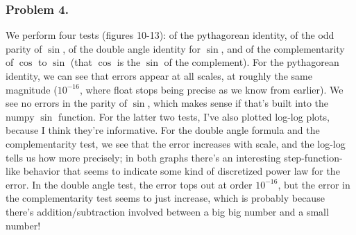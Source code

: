 \documentclass[11pt]{article}
\begin{document}
    \subsubsection{Problem 4.}\label{problem-4.}

We perform four tests (figures 10-13): of the pythagorean identity, of
the odd parity of \(\sin\), of the double angle identity for \(\sin\),
and of the complementarity of \(\cos\) to \(\sin\) (that \(\cos\) is the
\(\sin\) of the complement). For the pythagorean identity, we can see
that errors appear at all scales, at roughly the same magnitude
(\(10^{-16}\), where float stops being precise as we know from earlier).
We see no errors in the parity of \(\sin\), which makes sense if that's
built into the numpy \(\sin\) function. For the latter two tests, I've
also plotted log-log plots, because I think they're informative. For the
double angle formula and the complementarity test, we see that the error
increases with scale, and the log-log tells us how more precisely; in
both graphs there's an interesting step-function-like behavior that
seems to indicate some kind of discretized power law for the error. In
the double angle test, the error tops out at order \(10^{-16}\), but the
error in the complementarity test seems to just increase, which is
probably because there's addition/subtraction involved between a big big
number and a small number!

    \begin{center}
    \end{center}
    { \hspace*{\fill} \\}
    
    \begin{center}
    \end{center}
    { \hspace*{\fill} \\}
    
    \begin{center}
    \end{center}
    { \hspace*{\fill} \\}
    
    \begin{center}
    \end{center}
    { \hspace*{\fill} \\}
    
\end{document}
